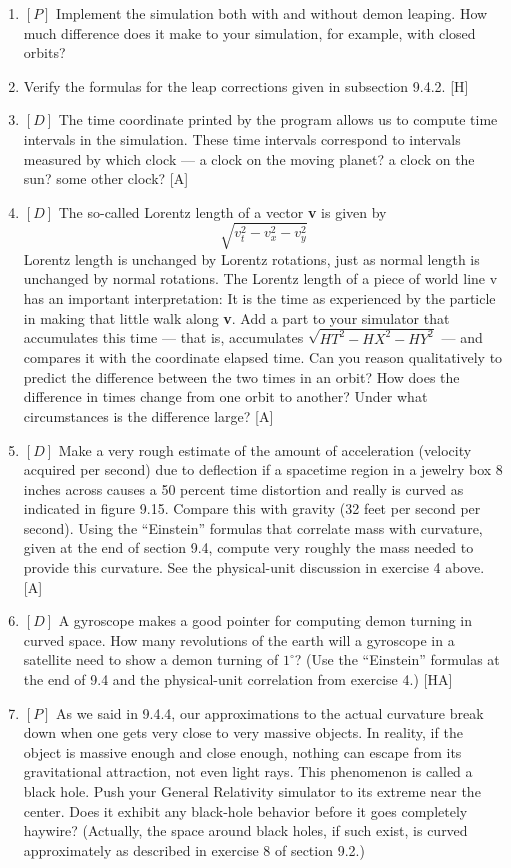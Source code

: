 \documentclass{book}
\begin{document}
\begin{enumerate}
\item $[P]$ Implement the simulation both with and without demon leaping.
How much difference does it make to your simulation, for example, with
closed orbits?

\item Verify the formulas for the leap corrections given in subsection 9.4.2.
[H]

\item $[D]$ The time coordinate printed by the program allows us to compute
time intervals in the simulation. These time intervals correspond to
intervals measured by which clock --- a clock on the moving planet? a
clock on the sun? some other clock? [A]

\item $[D]$ The so-called Lorentz length of a vector \textbf{v} is given by
$$\sqrt{v_t^2 - v_x^2 - v_y^2}$$
 Lorentz length is unchanged by Lorentz rotations, just as normal length
is unchanged by normal rotations. The Lorentz length of a piece of
world line v has an important interpretation: It is the time as experienced by the particle in making that little walk along \textbf{v}. Add a
part to your simulator that accumulates this time --- that is, accumulates
$\sqrt{HT^2 - HX^2 - HY^2}$ --- and compares it with the coordinate elapsed
time. Can you reason qualitatively to predict the difference between the
two times in an orbit? How does the difference in times change from one
orbit to another? Under what circumstances is the difference large? [A]

\item $[D]$ Make a very rough estimate of the amount of acceleration
(velocity acquired per second) due to deflection if a spacetime region in a
jewelry box 8 inches across causes a 50 percent time distortion and really
is curved as indicated in figure 9.15. Compare this with gravity (32 feet
per second per second). Using the ``Einstein'' formulas that correlate
mass with curvature, given at the end of section 9.4, compute very
roughly the mass needed to provide this curvature. See the physical-unit
discussion in exercise 4 above. [A]

\item $[D]$ A gyroscope makes a good pointer for computing demon turning
in curved space. How many revolutions of the earth will a gyroscope
in a satellite need to show a demon turning of $1^{\circ}$? (Use the ``Einstein''
formulas at the end of 9.4 and the physical-unit correlation from exercise
4.) [HA]

\item $[P]$ As we said in 9.4.4, our approximations to the actual curvature
break down when one gets very close to very massive objects. In reality,
if the object is massive enough and close enough, nothing can escape
from its gravitational attraction, not even light rays. This phenomenon
is called a black hole. Push your General Relativity simulator to its
extreme near the center. Does it exhibit any black-hole behavior before
it goes completely haywire? (Actually, the space around black holes, if
such exist, is curved approximately as described in exercise 8 of section
9.2.)
\end{enumerate}
\end{document}
